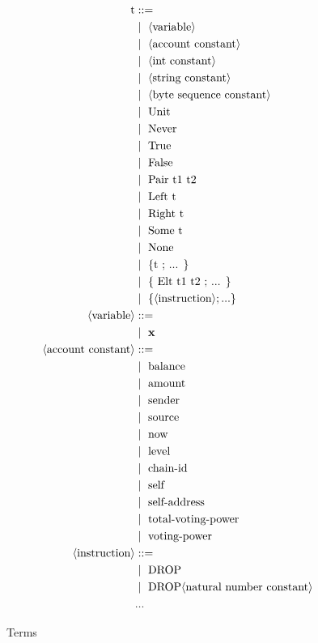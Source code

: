 \documentclass[a4paper,UKenglish,cleveref, autoref, thm-restate]{lipics-v2021}
\begin{document}
\begin{figure}[]
\begin{align*}
\text{t} &::= \\
   &\mid\ \langle \text{variable} \rangle \\
   &\mid\ \langle \text{account constant} \rangle \\
   &\mid\ \langle \text{int constant} \rangle \\
   &\mid\ \langle \text{string constant} \rangle \\
   &\mid\ \langle \text{byte sequence constant} \rangle \\
   &\mid\ \text{Unit} \\
   &\mid\ \text{Never} \\
   &\mid\ \text{True} \\
   &\mid\ \text{False} \\
   &\mid\ \text{Pair}\ \text{t1 t2}\\
   &\mid\ \text{Left}\ \text{t}\\
   &\mid\ \text{Right}\ \text{t}\\ 
   &\mid\ \text{Some}\ \text{t}\\
   &\mid\ \text{None} \\
   &\mid\ \text{\{t ; ... \}}\\
   &\mid\ \text{\{ Elt t1 t2 ; ... \}}\\
   &\mid\ \{ \langle\text{instruction}\rangle; ... \}   \\
\langle \text{variable} \rangle &::= \\ 
   &\mid\ \textbf{x}\\
\langle \text{account constant} \rangle &::= \\ 
   &\mid\ \text{balance} \\
   &\mid\ \text{amount} \\
   &\mid\ \text{sender} \\
   &\mid\ \text{source} \\
   &\mid\ \text{now} \\
   &\mid\ \text{level} \\
   &\mid\ \text{chain-id} \\
   &\mid\ \text{self}  \\
   &\mid\ \text{self-address}  \\
   &\mid\ \text{total-voting-power}  \\
   &\mid\ \text{voting-power}  \\
\langle\text{instruction}\rangle &::= \\
  &\mid\ \text{DROP} \\
  &\mid\ \text{DROP} \langle\text{natural number constant}\rangle \\
  &\text{...}
\end{align*}
\caption{Terms}
\label{fig:term}
\end{figure}
\end{document}
